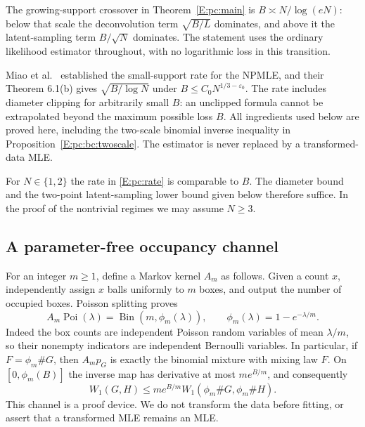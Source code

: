 \documentclass[11pt,a4paper]{article}
\theoremstyle{definition}
\theoremstyle{remark}
\numberwithin{equation}{section}
\begin{document}
The growing-support crossover in Theorem~\ref{E:pc:main} is
$B\asymp N/\log(eN)$: below that scale the deconvolution term
$\sqrt{B/L}$ dominates, and above it the latent-sampling term
$B/\sqrt N$ dominates. The statement uses the ordinary likelihood
estimator throughout, with no logarithmic loss in this transition.

Miao et al.\ \cite[Theorem 6.1(a)]{PC_Miao2021} established the
small-support rate for the NPMLE, and their Theorem 6.1(b) gives
$\sqrt{B/\log N}$ under $B\le C_0N^{1/3-\varepsilon_0}$.
The rate includes diameter clipping for arbitrarily small $B$:
an unclipped formula cannot be extrapolated beyond the maximum
possible loss $B$.
All ingredients used below are proved here, including the two-scale
binomial inverse inequality in Proposition~\ref{E:pc:bc:twoscale}.
The estimator is never replaced by a transformed-data MLE.

For $N\in\{1,2\}$ the rate in \eqref{E:pc:rate} is comparable to $B$.
The diameter bound and the two-point latent-sampling lower bound given
below therefore suffice. In the proof of the nontrivial regimes we
may assume $N\ge3$.

\subsection{A parameter-free occupancy channel}

For an integer $m\ge1$, define a Markov kernel $A_m$ as follows.  Given
a count $x$, independently assign $x$ balls uniformly to $m$ boxes,
and output the number of occupied boxes.  Poisson splitting proves
\begin{equation}\label{E:pc:occupancy}
 A_m\operatorname{Poi}(\lambda)
 =\operatorname{Bin}(m,\phi_m(\lambda)),\qquad
 \phi_m(\lambda)=1-e^{-\lambda/m}.
\end{equation}
Indeed the box counts are independent Poisson random variables of
mean $\lambda/m$, so their nonempty indicators are independent
Bernoulli variables.  In particular, if $F=\phi_m\#G$, then
$A_mp_G$ is exactly the binomial mixture with mixing law $F$.
On $[0,\phi_m(B)]$ the inverse map has derivative at most
$m e^{B/m}$, and consequently
\begin{equation}\label{E:pc:backmap}
 W_1(G,H)\le m e^{B/m}
                 W_1(\phi_m\#G,\phi_m\#H).
\end{equation}
This channel is a proof device.  We do not transform the data before
fitting, or assert that a transformed MLE remains an MLE.
\end{document}
